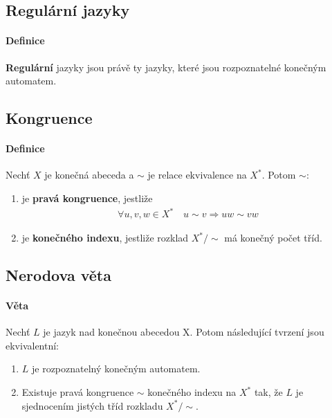 \documentclass[a4paper,12pt,titlepage]{article}
\begin{document}
\subsection{Regulární jazyky}
\setcounter{equation}{0}
\paragraph{Definice}
\textbf{Regulární} jazyky jsou právě ty jazyky, které jsou rozpoznatelné
konečným automatem.
\subsection{Kongruence}
\setcounter{equation}{0}
\paragraph{Definice}
Nechť $X$ je konečná abeceda a $\sim$ je relace ekvivalence na $X^*$. Potom
$\sim$:
\begin{enumerate}
	\item je \textbf{pravá kongruence}, jestliže
		\begin{align}
			\forall u,v,w\in X^* \quad u\sim v \Rightarrow uw \sim vw
		\end{align}
	\item je \textbf{konečného indexu}, jestliže rozklad $X^*/\sim$ má konečný
	počet tříd.
\end{enumerate}
\subsection{Nerodova věta}
\setcounter{equation}{0}
\paragraph{Věta}
Nechť $L$ je jazyk nad konečnou abecedou X. Potom následující tvrzení jsou
ekvivalentní:
\begin{enumerate}
	\item $L$ je rozpoznatelný konečným automatem.
	\item Existuje pravá kongruence $\sim$ konečného indexu na $X^*$ tak, že $L$
	je sjednocením jistých tříd rozkladu $X^*/\sim$.
\end{enumerate}
\end{document}

